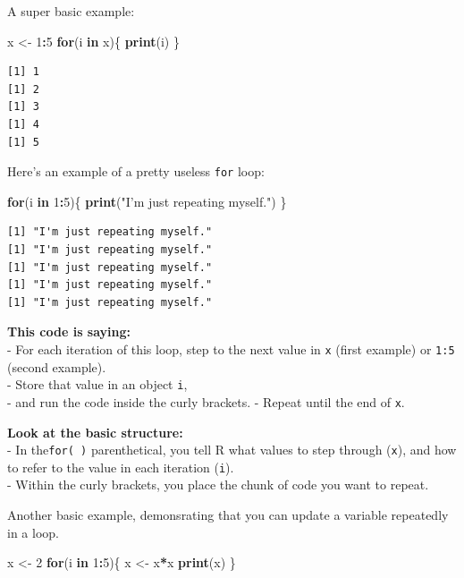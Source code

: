 \documentclass[
]{book}
\newenvironment{Shaded}{\begin{snugshade}}{\end{snugshade}}
\newcommand{\ControlFlowTok}[1]{\textcolor[rgb]{0.13,0.29,0.53}{\textbf{#1}}}
\newcommand{\DecValTok}[1]{\textcolor[rgb]{0.00,0.00,0.81}{#1}}
\newcommand{\KeywordTok}[1]{\textcolor[rgb]{0.13,0.29,0.53}{\textbf{#1}}}
\newcommand{\NormalTok}[1]{#1}
\newcommand{\OperatorTok}[1]{\textcolor[rgb]{0.81,0.36,0.00}{\textbf{#1}}}
\newcommand{\StringTok}[1]{\textcolor[rgb]{0.31,0.60,0.02}{#1}}
\begin{document}
A super basic example:

\begin{Shaded}
\begin{Highlighting}[]
\NormalTok{x <-}\StringTok{ }\DecValTok{1}\OperatorTok{:}\DecValTok{5}
\ControlFlowTok{for}\NormalTok{(i }\ControlFlowTok{in}\NormalTok{ x)\{}
  \KeywordTok{print}\NormalTok{(i)}
\NormalTok{\}}
\end{Highlighting}
\end{Shaded}

\begin{verbatim}
[1] 1
[1] 2
[1] 3
[1] 4
[1] 5
\end{verbatim}

Here's an example of a pretty useless \texttt{for} loop:

\begin{Shaded}
\begin{Highlighting}[]
\ControlFlowTok{for}\NormalTok{(i }\ControlFlowTok{in} \DecValTok{1}\OperatorTok{:}\DecValTok{5}\NormalTok{)\{}
  \KeywordTok{print}\NormalTok{(}\StringTok{"I'm just repeating myself."}\NormalTok{)}
\NormalTok{\}}
\end{Highlighting}
\end{Shaded}

\begin{verbatim}
[1] "I'm just repeating myself."
[1] "I'm just repeating myself."
[1] "I'm just repeating myself."
[1] "I'm just repeating myself."
[1] "I'm just repeating myself."
\end{verbatim}

\textbf{This code is saying:}\\
- For each iteration of this loop, step to the next value in \texttt{x} (first example) or \texttt{1:5} (second example).\\
- Store that value in an object \texttt{i},\\
- and run the code inside the curly brackets.
- Repeat until the end of \texttt{x}.

\textbf{Look at the basic structure:}\\
- In the\texttt{for(\ )} parenthetical, you tell R what values to step through (\texttt{x}), and how to refer to the value in each iteration (\texttt{i}).\\
- Within the curly brackets, you place the chunk of code you want to repeat.

Another basic example, demonsrating that you can update a variable repeatedly in a loop.

\begin{Shaded}
\begin{Highlighting}[]
\NormalTok{x <-}\StringTok{ }\DecValTok{2}
\ControlFlowTok{for}\NormalTok{(i }\ControlFlowTok{in} \DecValTok{1}\OperatorTok{:}\DecValTok{5}\NormalTok{)\{}
\NormalTok{  x <-}\StringTok{ }\NormalTok{x}\OperatorTok{*}\NormalTok{x}
  \KeywordTok{print}\NormalTok{(x)}
\NormalTok{\}}
\end{Highlighting}
\end{Shaded}
\end{document}
